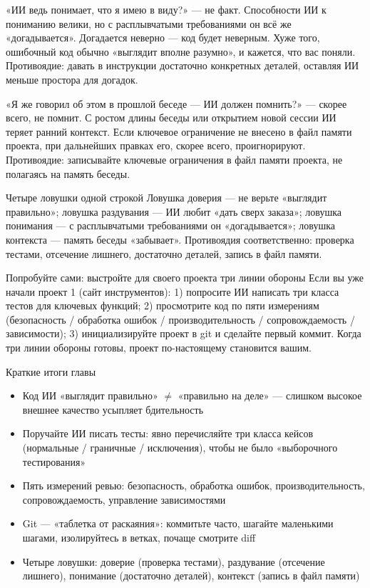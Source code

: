 
«ИИ ведь понимает, что я имею в виду?» — не факт. Способности ИИ к пониманию велики, но с расплывчатыми требованиями он всё же «догадывается». Догадается неверно — код будет неверным. Хуже того, ошибочный код обычно «выглядит вполне разумно», и кажется, что вас поняли. Противоядие: давать в инструкции достаточно конкретных деталей, оставляя ИИ меньше простора для догадок.


«Я же говорил об этом в прошлой беседе — ИИ должен помнить?» — скорее всего, не помнит. С ростом длины беседы или открытием новой сессии ИИ теряет ранний контекст. Если ключевое ограничение не внесено в файл памяти проекта, при дальнейших правках его, скорее всего, проигнорируют. Противоядие: записывайте ключевые ограничения в файл памяти проекта, не полагаясь на память беседы.

\begin{tcbwarn}{Четыре ловушки одной строкой}
Ловушка доверия — не верьте «выглядит правильно»; ловушка раздувания — ИИ любит «дать сверх заказа»; ловушка понимания — с расплывчатыми требованиями он «догадывается»; ловушка контекста — память беседы «забывает». Противоядия соответственно: проверка тестами, отсечение лишнего, достаточно деталей, запись в файл памяти.

\end{tcbwarn}

\begin{tcbpractice}{Попробуйте сами: выстройте для своего проекта три линии обороны}
Если вы уже начали проект 1 (сайт инструментов): 1) попросите ИИ написать три класса тестов для ключевых функций; 2) просмотрите код по пяти измерениям (безопасность / обработка ошибок / производительность / сопровождаемость / зависимости); 3) инициализируйте проект в git и сделайте первый коммит. Когда три линии обороны готовы, проект по-настоящему становится вашим.

\end{tcbpractice}

\begin{tcbsummary}{Краткие итоги главы}
\begin{itemize}
  \item Код ИИ «выглядит правильно» $\neq$ «правильно на деле» — слишком высокое внешнее качество усыпляет бдительность
  \item Поручайте ИИ писать тесты: явно перечисляйте три класса кейсов (нормальные / граничные / исключения), чтобы не было «выборочного тестирования»
  \item Пять измерений ревью: безопасность, обработка ошибок, производительность, сопровождаемость, управление зависимостями
  \item Git — «таблетка от раскаяния»: коммитьте часто, шагайте маленькими шагами, изолируйтесь в ветках, почаще смотрите diff
  \item Четыре ловушки: доверие (проверка тестами), раздувание (отсечение лишнего), понимание (достаточно деталей), контекст (запись в файл памяти)
\end{itemize}

\end{tcbsummary}
